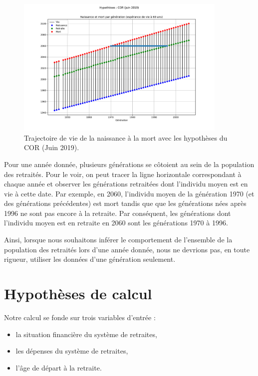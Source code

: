 \documentclass[10pt]{article}
\begin{document}
\begin{figure}
\begin{center}
\includegraphics[width=0.9\textwidth]{Simulation-generation-vs-annee.pdf}
\end{center}
\caption{Trajectoire de vie de la naissance à la mort avec 
les hypothèses du COR (Juin 2019).}
\label{fig-trajectoire-vie}
\end{figure}

Pour une année donnée, plusieurs générations se côtoient au sein de la population des retraités. 
Pour le voir, on peut tracer la ligne horizontale correspondant à chaque année et observer les générations retraitées dont l'individu moyen est en vie à cette date. 
Par exemple, en 2060, l'individu moyen de la génération 1970 (et des générations précédentes) est mort tandis que que les générations nées après 1996 ne sont pas encore à la retraite. 
Par conséquent, les générations dont l'individu moyen est en retraite en 2060 sont les générations 1970 à 1996. 

Ainsi, lorsque nous souhaitons inférer le comportement de l'ensemble de la 
population des retraités lors d'une année donnée, nous ne devrions pas, en toute 
rigueur, utiliser les données d'une génération seulement. 


\section{Hypothèses de calcul}

Notre calcul se fonde sur trois variables d'entrée :
\begin{itemize}
\item la situation financière du système de retraites, 
\item les dépenses du système de retraites, 
\item l'âge de départ à la retraite. 
\end{itemize}
\end{document}
